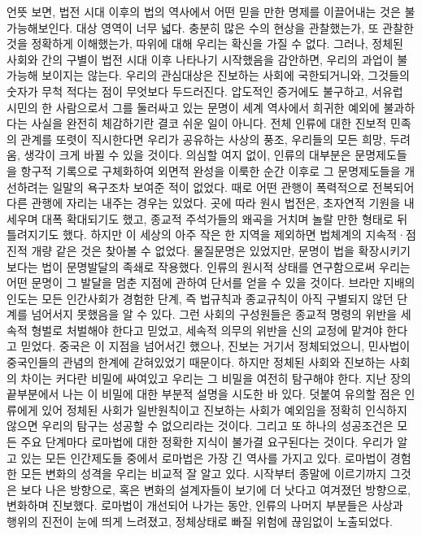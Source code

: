 언뜻 보면, 법전 시대 이후의 법의 역사에서 어떤 믿을 만한 명제를
이끌어내는 것은 불가능해보인다.
대상 영역이 너무 넓다.
충분히 많은 수의 현상을 관찰했는가,
또 관찰한 것을 정확하게 이해했는가, 따위에 대해 우리는 확신을 가질 수 없다.
그러나,
정체된 사회와
 간의 구별이
법전 시대 이후
나타나기 시작했음을
감안하면, 우리의 과업이 불가능해 보이지는 않는다.
우리의 관심대상은 진보하는 사회에 국한되거니와,
그것들의 숫자가 무척 적다는 점이 무엇보다 두드러진다.
압도적인 증거에도 불구하고, 서유럽 시민의 한 사람으로서
그를 둘러싸고 있는 문명이 세계 역사에서 희귀한 예외에 불과하다는 사실을
완전히 체감하기란 결코 쉬운 일이 아니다.
전체 인류에 대한 진보적 민족의 관계를 또렷이 직시한다면
우리가 공유하는 사상의 풍조, 우리들의 모든 희망, 두려움, 생각이
크게 바뀔 수 있을 것이다.
의심할 여지 없이, 인류의 대부분은
문명제도들을 항구적 기록으로 구체화하여 외면적 완성을 이룩한 순간 이후로
그 문명제도들을 개선하려는 일말의 욕구조차
보여준 적이 없었다.
때로 어떤 관행이 폭력적으로 전복되어 다른 관행에 자리는 내주는 경우는 있었다.
곳에 따라 원시 법전은,
초자연적 기원을 내세우며 대폭 확대되기도 했고,
종교적 주석가들의 왜곡을 거치며 놀랄 만한 형태로 뒤틀려지기도 했다.
하지만 이 세상의 아주 작은 한 지역을 제외하면
법체계의 지속적^^b7점진적 개량 같은 것은 찾아볼 수 없었다.
물질문명은 있었지만, 문명이 법을 확장시키기보다는
법이 문명발달의 족쇄로 작용했다.
인류의 원시적 상태를 연구함으로써 우리는
어떤 문명이 그 발달을 멈춘 지점에 관하여 단서를 얻을 수 있을 것이다.
브라만 지배의 인도는 모든 인간사회가 경험한 단계, 즉
법규칙과 종교규칙이 아직 구별되지 않던 단계를 넘어서지 못했음을 알 수 있다.
그런 사회의 구성원들은 종교적 명령의 위반을 세속적 형벌로 처벌해야 한다고
믿었고, 세속적 의무의 위반을 신의 교정에 맡겨야 한다고 믿었다.
중국은 이 지점을 넘어서긴 했으나,
진보는 거기서 정체되었으니,
민사법이 중국인들의 관념의 한계에 갇혀있었기 때문이다.
하지만 정체된 사회와 진보하는 사회의 차이는
커다란 비밀에 싸여있고 우리는 그 비밀을 여전히 탐구해야 한다.
지난 장의 끝부분에서 나는 이 비밀에 대한 부분적 설명을 시도한 바 있다.
덧붙여 유의할 점은 인류에게 있어 정체된 사회가 일반원칙이고
진보하는 사회가 예외임을 정확히 인식하지 않으면 우리의 탐구는
성공할 수 없으리라는 것이다.
그리고 또 하나의 성공조건은 모든 주요 단계마다 로마법에 대한 정확한 지식이
불가결 요구된다는 것이다.
우리가 알고 있는 모든 인간제도들 중에서 로마법은 가장 긴 역사를 가지고 있다.
로마법이 경험한 모든 변화의 성격을 우리는 비교적 잘 알고 있다.
시작부터 종말에 이르기까지 그것은 보다 나은 방향으로,
혹은 변화의 설계자들이 보기에 더 낫다고 여겨졌던 방향으로,
변화하며 진보했다.
로마법이 개선되어 나가는 동안,
인류의 나머지 부분들은 사상과 행위의 진전이 눈에 띄게 느려졌고,
정체상태로 빠질 위험에 끊임없이 노출되었다.

